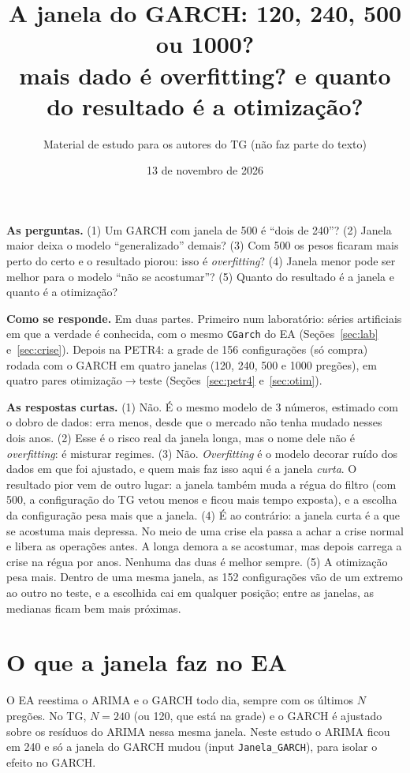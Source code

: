 \documentclass[11pt,a4paper]{article}
\title{\textbf{A janela do GARCH: 120, 240, 500 ou 1000?}\\[2pt]\large mais dado é overfitting? e quanto do resultado é a otimização?}
\author{Material de estudo para os autores do TG (não faz parte do texto)}
\date{13 de novembro de 2026}
\begin{document}
\maketitle

\begin{ideia}
\textbf{As perguntas.} (1) Um GARCH com janela de 500 é ``dois de 240''? (2) Janela maior deixa o modelo
``generalizado'' demais? (3) Com 500 os pesos ficaram mais perto do certo e o resultado piorou: isso é
\emph{overfitting}? (4) Janela menor pode ser melhor para o modelo ``não se acostumar''? (5) Quanto do resultado é
a janela e quanto é a otimização?

\textbf{Como se responde.} Em duas partes. Primeiro num laboratório: séries artificiais em que a verdade é
conhecida, com o mesmo \texttt{CGarch} do EA (Seções~\ref{sec:lab} e~\ref{sec:crise}). Depois na PETR4: a grade
de 156 configurações (só compra) rodada com o GARCH em quatro janelas (120, 240, 500 e 1000 pregões), em quatro
pares otimização$\to$teste (Seções~\ref{sec:petr4} e~\ref{sec:otim}).

\textbf{As respostas curtas.}
(1) Não. É o mesmo modelo de 3 números, estimado com o dobro de dados: erra menos, desde que o mercado não tenha
mudado nesses dois anos.
(2) Esse é o risco real da janela longa, mas o nome dele não é \emph{overfitting}: é misturar regimes.
(3) Não. \emph{Overfitting} é o modelo decorar ruído dos dados em que foi ajustado, e quem mais faz isso aqui é a
janela \emph{curta}. O resultado pior vem de outro lugar: a janela também muda a régua do filtro (com 500, a
configuração do TG vetou menos e ficou mais tempo exposta), e a escolha da configuração pesa mais que a janela.
(4) É ao contrário: a janela curta é a que se acostuma mais depressa. No meio de uma crise ela passa a achar a
crise normal e libera as operações antes. A longa demora a se acostumar, mas depois carrega a crise na régua por
anos. Nenhuma das duas é melhor sempre.
(5) A otimização pesa mais. Dentro de uma mesma janela, as 152 configurações vão de um extremo ao outro no
teste, e a escolhida cai em qualquer posição; entre as janelas, as medianas ficam bem mais próximas.
\end{ideia}

\section{O que a janela faz no EA}

O EA reestima o ARIMA e o GARCH todo dia, sempre com os últimos $N$ pregões. No TG, $N=240$ (ou 120, que está na
grade) e o GARCH é ajustado sobre os resíduos do ARIMA nessa mesma janela. Neste estudo o ARIMA ficou em 240 e só
a janela do GARCH mudou (input \texttt{Janela\_GARCH}), para isolar o efeito no GARCH.
\end{document}
